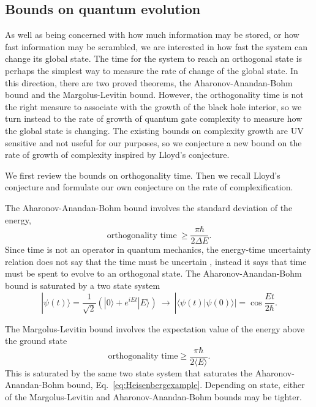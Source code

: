 \documentclass[12pt]{article}
\numberwithin{equation}{section}
\begin{document}
\subsection{Bounds on quantum evolution}

As well as being concerned with how much information may be stored, or how fast information may be scrambled, we are interested in how fast the system can change its global state. The time for the system to reach an orthogonal state is perhaps the simplest way to measure the rate of change of the global state. In this direction, there are two proved theorems, the Aharonov-Anandan-Bohm bound and the Margolus-Levitin bound. However, the orthogonality time is not the right measure to associate with the growth of the black hole interior, so we turn instead to the rate of growth of quantum gate complexity to measure how the global state is changing. The existing bounds on complexity growth are UV sensitive and not useful for our purposes, so we conjecture a new bound on the rate of growth of complexity inspired by Lloyd's conjecture. 

We first review the bounds on orthogonality time. Then we recall Lloyd's conjecture and formulate our own conjecture on the rate of complexification.

The Aharonov-Anandan-Bohm bound involves the standard deviation of the energy,
\begin{equation}
\textrm{orthogonality time} \ \geq \frac{\pi \hbar }{2  \Delta E} .
\end{equation}
Since time is not an operator in quantum mechanics, the energy-time uncertainty relation does not say that the time must be uncertain \cite{Anandan:1990fq,Aharonov:1961mka}, instead it says that time must be spent to evolve to an orthogonal state. The Aharonov-Anandan-Bohm bound is saturated by a two state system
\begin{equation}
| \psi (t) \rangle = \frac{1}{\sqrt{2}} \left( | 0 \rangle + e^{i E t} | E \rangle \right) \ \rightarrow  \ |\langle \psi(t) | \psi (0) \rangle | = \cos \frac{E t}{2 \hbar}. \label{eq:Heisenbergexample}
\end{equation}

The Margolus-Levitin bound involves the expectation value of the energy above the ground state \cite{Margolus:1997ih}
\begin{equation}
\textrm{orthogonality time} \geq \frac{\pi \hbar}{2 \langle E \rangle} .
\end{equation}
This is saturated by the same two state system that saturates the Aharonov-Anandan-Bohm bound, Eq.~\ref{eq:Heisenbergexample}. Depending on state, either of the Margolus-Levitin and Aharonov-Anandan-Bohm bounds may be tighter.
\end{document}
